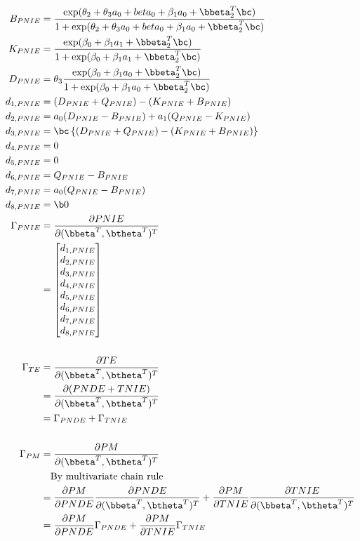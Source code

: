 \documentclass[dvipdfmx,10pt]{article}
\begin{document}
\begin{align*}
  B_{PNIE} &= \frac
      {    \exp(\theta_{2} + \theta_{3}a_{0} + beta_{0} + \beta_{1}a_{0} + \bbeta_{2}^{T}\bc)}
      {1 + \exp(\theta_{2} + \theta_{3}a_{0} + beta_{0} + \beta_{1}a_{0} + \bbeta_{2}^{T}\bc)}\\
  K_{PNIE} &= \frac
      {    \exp(\beta_{0} + \beta_{1}a_{1} + \bbeta_{2}^{T}\bc)}
      {1 + \exp(\beta_{0} + \beta_{1}a_{1} + \bbeta_{2}^{T}\bc)}\\
  D_{PNIE} &= \theta_{3} \frac
      {    \exp(\beta_{0} + \beta_{1}a_{0} + \bbeta_{2}^{T}\bc)}
      {1 + \exp(\beta_{0} + \beta_{1}a_{0} + \bbeta_{2}^{T}\bc)}\\
  d_{1,PNIE} &= (D_{PNIE} + Q_{PNIE}) - (K_{PNIE} + B_{PNIE})\\
  d_{2,PNIE} &= a_{0}(D_{PNIE} - B_{PNIE}) + a_{1}(Q_{PNIE} - K_{PNIE})\\
  d_{3,PNIE} &= \bc \left\{ (D_{PNIE} + Q_{PNIE}) - (K_{PNIE} + B_{PNIE}) \right\}\\
  d_{4,PNIE} &= 0\\
  d_{5,PNIE} &= 0\\
  d_{6,PNIE} &= Q_{PNIE} - B_{PNIE}\\
  d_{7,PNIE} &= a_{0} (Q_{PNIE} - B_{PNIE})\\
  d_{8,PNIE} &= \b0\\
  \Gamma_{PNIE}
  &= \frac{\partial PNIE}{\partial (\bbeta^{T},\btheta^{T})^{T}}\\
  &= \begin{bmatrix}
      d_{1,PNIE}\\
      d_{2,PNIE}\\
      d_{3,PNIE}\\
      d_{4,PNIE}\\
      d_{5,PNIE}\\
      d_{6,PNIE}\\
      d_{7,PNIE}\\
      d_{8,PNIE}\\
    \end{bmatrix}\\
  \\
  \Gamma_{TE}
  &= \frac{\partial TE}{\partial (\bbeta^{T},\btheta^{T})^{T}}\\
  &= \frac{\partial (PNDE+TNIE)}{\partial (\bbeta^{T},\btheta^{T})^{T}}\\
  &= \Gamma_{PNDE} + \Gamma_{TNIE}\\
  \\
  \Gamma_{PM}
  &= \frac{\partial PM}{\partial (\bbeta^{T},\btheta^{T})^{T}}\\
  &~~~\text{By multivariate chain rule}\\
  &= \frac{\partial PM}{\partial PNDE}\frac{\partial PNDE}{\partial (\bbeta^{T},\btheta^{T})^{T}} + \frac{\partial PM}{\partial TNIE}\frac{\partial TNIE}{\partial (\bbeta^{T},\btheta^{T})^{T}}\\
  &= \frac{\partial PM}{\partial PNDE}\Gamma_{PNDE} + \frac{\partial PM}{\partial TNIE}\Gamma_{TNIE}\\
\end{align*}
\end{document}
